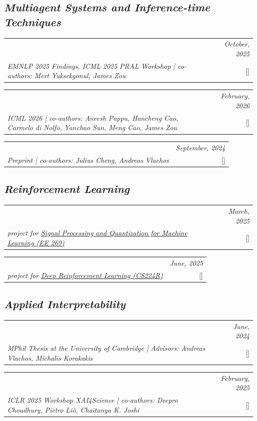 \documentclass[a4paper,11pt]{article}
\makeatletter
\newcommand{\resumeProject}[4]{
\vspace{0mm}
    \begin{tabular*}{0.98\textwidth}[t]{l@{\extracolsep{\fill}}r}
        \text{#1} & \textit{\footnotesize{#3}} \\
        \footnotesize{\textit{#2}} & \footnotesize{#4}
    \end{tabular*}
    \vspace{-0mm}
}
\makeatother
\begin{document}
\subsection*{\textit{Multiagent Systems and Inference-time Techniques}}
\vspace{-2mm}
\resumeProject
  {Inefficiencies of Meta Agents for Agent Design}
  {EMNLP 2025 Findings, ICML 2025 PRAL Workshop | co-authors: Mert Yuksekgonul, James Zou}
  {October, 2025}
  {{}[\href{https://arxiv.org/abs/2510.06711}{\textcolor{darkblue}{\faGithub}}]}
\resumeProject
  {Multi-Agent Teams Hold Experts Back}
  {ICML 2026 | co-authors: Aneesh Pappu, Hancheng Cao, Carmelo di Nolfo, Yanchao Sun, Meng Cao, James Zou}
  {February, 2026}
  {{}[\href{https://arxiv.org/abs/2602.01011}{\textcolor{darkblue}{\faGithub}}]}
\resumeProject
  {Bayesian Optimization for Guided Hypothesis Sampling in Minimum Bayes Risk Decoding}
  {Preprint | co-authors: Julius Cheng, Andreas Vlachos}
  {September, 2024}
  {{}[\href{https://github.com/batu-el/guided-hypothesis-sampling}{\textcolor{darkblue}{\faGithub}}]}
\vspace{-4mm}
\subsection*{\textit{Reinforcement Learning}}
\vspace{-2mm}
\resumeProject
  {When Does Video Pretraining Help? Improving Embodied Navigation with Next-Frame Prediction}
  {project for \href{https://web.stanford.edu/class/ee269/}{Signal Processing and Quantization for Machine Learning (EE 269)}}
  {March, 2025}
  {{}[\href{https://github.com/batu-el/when-vpt}{\textcolor{darkblue}{\faGithub}}]}
\resumeProject
  {Reinforcement Learning Training for Dynamic Context Management in Mathematical Reasoning}
  {project for \href{https://cs224r.stanford.edu/}{Deep Reinforcement Learning (CS224R)}}
  {June, 2025}
  {{}[\href{https://github.com/batu-el/TrainedMemory2}{\textcolor{darkblue}{\faGithub}}]}
\vspace{-4mm}
\subsection*{\textit{Applied Interpretability}}
\vspace{-2mm}
\resumeProject
  {Understanding and Improving Representation Learning in the Presence of Shortcuts}
  {MPhil Thesis at the University of Cambridge | Advisors: Andreas Vlachos, Michalis Korakakis}
  {June, 2024}
  {{}[\href{https://github.com/batu-el/understanding-shortcuts}{\textcolor{darkblue}{\faGithub}}]}
\resumeProject
  {Towards Mechanistic Interpretability of Graph Transformers via Attention Graphs}
  {ICLR 2025 Workshop XAI4Science | co-authors: Deepro Choudhury, Pietro Liò, Chaitanya K. Joshi}
  {February, 2025}
  {{}[\href{https://arxiv.org/abs/2502.12352}{\textcolor{darkblue}{\faGithub}}]}
\vspace{-4mm}
\end{document}
